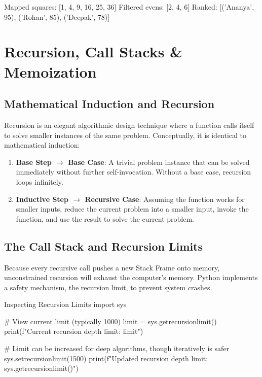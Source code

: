 \begin{outputbox}
Mapped squares: [1, 4, 9, 16, 25, 36]
Filtered evens: [2, 4, 6]
Ranked: [('Ananya', 95), ('Rohan', 85), ('Deepak', 78)]
\end{outputbox}

\section{Recursion, Call Stacks \& Memoization}

\subsection{Mathematical Induction and Recursion}
Recursion is an elegant algorithmic design technique where a function calls itself to solve smaller instances of the same problem. Conceptually, it is identical to mathematical induction:
\begin{enumerate}
    \item \textbf{Base Step $\rightarrow$ Base Case}: A trivial problem instance that can be solved immediately without further self-invocation. Without a base case, recursion loops infinitely.
    \item \textbf{Inductive Step $\rightarrow$ Recursive Case}: Assuming the function works for smaller inputs, reduce the current problem into a smaller input, invoke the function, and use the result to solve the current problem.
\end{enumerate}

\subsection{The Call Stack and Recursion Limits}
Because every recursive call pushes a new Stack Frame onto memory, unconstrained recursion will exhaust the computer's memory. Python implements a safety mechanism, the recursion limit, to prevent system crashes.

\begin{pythoncode}{Inspecting Recursion Limits}
import sys

# View current limit (typically 1000)
limit = sys.getrecursionlimit()
print(f"Current recursion depth limit: {limit}")

# Limit can be increased for deep algorithms, though iteratively is safer
sys.setrecursionlimit(1500)
print(f"Updated recursion depth limit: {sys.getrecursionlimit()}")
\end{pythoncode}


